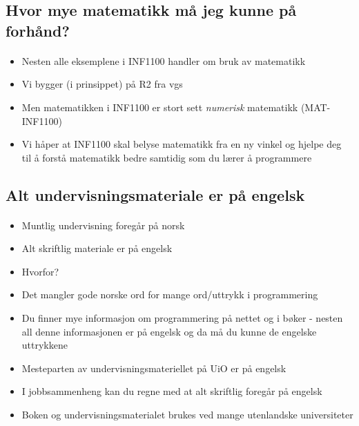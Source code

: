 \documentclass[%
oneside,                 %
final,                   %
10pt]{article}
\begin{document}
\noindent



\subsection*{Hvor mye matematikk må jeg kunne på forhånd?}


\paragraph{}
\begin{itemize}
  \item Nesten alle eksemplene i INF1100 handler om bruk av matematikk

  \item Vi bygger (i prinsippet) på R2 fra vgs

  \item Men matematikken i INF1100 er stort sett \emph{numerisk} matematikk (MAT-INF1100)

  \item Vi håper at INF1100 skal belyse matematikk fra en ny vinkel og hjelpe deg til å forstå matematikk bedre samtidig som du lærer å programmere
\end{itemize}

\noindent



\subsection*{Alt undervisningsmateriale er på engelsk}


\paragraph{}
\begin{itemize}
  \item Muntlig undervisning foregår på norsk

  \item Alt skriftlig materiale er på engelsk

  \item Hvorfor?

  \item Det mangler gode norske ord for mange ord/uttrykk i programmering

  \item Du finner mye informasjon om programmering på nettet og i bøker - nesten all denne informasjonen er på engelsk og da må du kunne de engelske uttrykkene

  \item Mesteparten av undervisningsmateriellet på UiO er på engelsk

  \item I jobbsammenheng kan du regne med at alt skriftlig foregår på engelsk

  \item Boken og undervisningsmaterialet brukes ved mange utenlandske universiteter
\end{itemize}

\noindent



\end{document}
